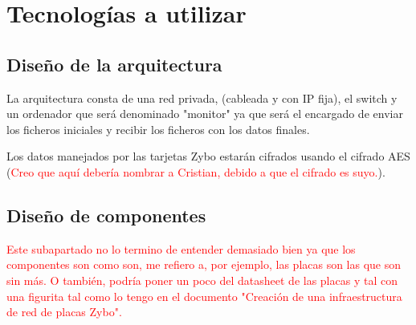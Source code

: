 \section{Tecnologías a utilizar}
\subsection{Diseño de la arquitectura}
La arquitectura consta de una red privada, (cableada y con IP fija), el switch y un ordenador que será denominado "monitor" ya que será el encargado de enviar los ficheros iniciales y recibir los ficheros con los datos finales.

Los datos manejados por las tarjetas Zybo estarán cifrados usando el cifrado AES (\textcolor{red}{Creo que aquí debería nombrar a Cristian, debido a que el cifrado es suyo.}).

\subsection{Diseño de componentes}
\textcolor{red}{Este subapartado no lo termino de entender demasiado bien ya que los componentes son como son, me refiero a, por ejemplo, las placas son las que son sin más. O también, podría poner un poco del datasheet de las placas y tal con una figurita tal como lo tengo en el documento "Creación de una infraestructura de red de placas Zybo".}